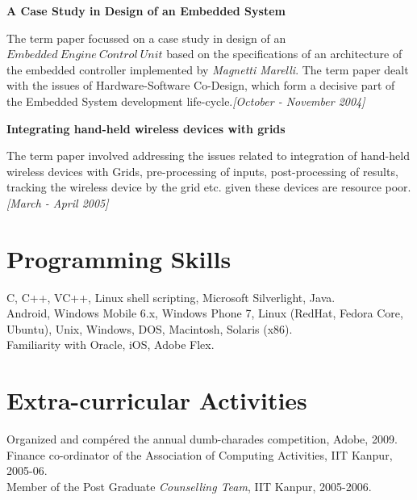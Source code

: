 \documentclass[margin,line]{resume}
\begin{document}
\begin{resume}
	\textbf{A Case Study in Design of an Embedded System}

	The term paper focussed on a case study in design of an $Embedded\ Engine\ Control\ Unit$ based on the specifications of an architecture of the embedded controller implemented by \textit{Magnetti Marelli}. The term paper dealt with the issues of Hardware-Software Co-Design, which form a decisive part of the Embedded System development life-cycle.\hfill \emph{[October - November 2004]}

	\textbf{Integrating hand-held wireless devices with grids}

	The term paper involved addressing the issues related to integration of hand-held wireless devices with Grids, pre-processing of inputs, post-processing of results, tracking the wireless device by the grid etc. given these devices are resource poor.\hfill \emph{[March - April 2005]}

	\section{\mysidestyle Programming Skills}

	C, C++, VC++, Linux shell scripting, Microsoft Silverlight, Java.\\
	Android, Windows Mobile 6.x, Windows Phone 7, Linux (RedHat, Fedora Core, Ubuntu), Unix, Windows, DOS, Macintosh, Solaris (x86).\\
	Familiarity with Oracle, iOS, Adobe Flex.

	\section{\mysidestyle Extra-curricular Activities}

	Organized and comp\'ered the annual dumb-charades competition, Adobe, 2009.\\
	Finance co-ordinator of the Association of Computing Activities, IIT Kanpur, 2005-06.\\
	Member of the Post Graduate \textit{Counselling Team}, IIT Kanpur, 2005-2006.


\end{resume}
\end{document}
